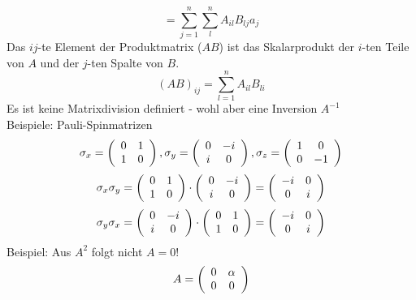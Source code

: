 \documentclass{article}
\begin{document}
\begin{equation*}
    = \sum_{j=1}^{n}\sum_{l}^{n}A_{il}B_{lj}a_j
\end{equation*}
Das $ij$-te Element der Produktmatrix ($AB$) ist das Skalarprodukt der $i$-ten Teile von $A$ und der $j$-ten Spalte von $B$.
\begin{equation*}
    \left(AB\right)_{ij} = \sum_{l=1}^{n}A_{il}B_{li}
\end{equation*}
Es ist keine Matrixdivision definiert - wohl aber eine Inversion $A^{-1}$\\
Beispiele: Pauli-Spinmatrizen
\begin{equation*}
    \sigma_x = \left(\begin{array}{c c}0&1\\1&0\end{array}\right), \sigma_y = \left(\begin{array}{c c}0&-i\\i&0\end{array}\right), \sigma_z = \left(\begin{array}{c c}1&0\\0&-1\end{array}\right)
\end{equation*}
\begin{equation*}
    \sigma_x\sigma_y = \left(\begin{array}{c c}0&1\\1&0\end{array}\right) \cdot \left(\begin{array}{c c}0&-i\\i&0\end{array}\right) = \left(\begin{array}{c c}-i&0\\0&i\end{array}\right)
\end{equation*}
\begin{equation*}
    \sigma_y\sigma_x = \left(\begin{array}{c c}0&-i\\i&0\end{array}\right) \cdot \left(\begin{array}{c c}0&1\\1&0\end{array}\right) = \left(\begin{array}{c c}-i&0\\0&i\end{array}\right)
\end{equation*}
Beispiel: Aus $A^2$ folgt nicht $A = 0$!
\begin{equation*}
    A = \left(\begin{array}{c c}
        0 & \alpha\\0 & 0
    \end{array}\right)
\end{equation*}
\end{document}

